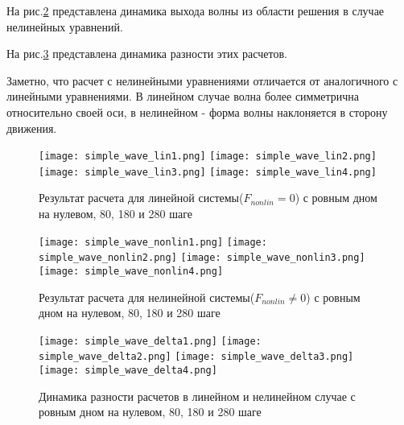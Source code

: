 На рис.\ref{fig:SimpleWaveNonLin} представлена динамика выхода волны из области решения в случае нелинейных уравнений.

На рис.\ref{fig:SimpleWaveDelta} представлена динамика разности этих расчетов.

Заметно, что расчет с нелинейными уравнениями отличается от аналогичного с линейными уравнениями. В линейном случае волна более симметрична относительно своей оси, в нелинейном - форма волны наклоняется в сторону движения.

\newpage
\begin{figure}[htp]
    \centering
    \vspace{12em}
    \texttt{[image: simple\_wave\_lin1.png]}
    \texttt{[image: simple\_wave\_lin2.png]}
    \texttt{[image: simple\_wave\_lin3.png]}
    \texttt{[image: simple\_wave\_lin4.png]}
    \caption{Результат расчета для линейной системы($F_{nonlin}=0$) с ровным дном на нулевом, 80, 180 и 280 шаге}
    \label{fig:SimpleWaveLin}
\end{figure}

\newpage
\begin{figure}[htp]
    \centering
    \vspace{12em}
    \texttt{[image: simple\_wave\_nonlin1.png]}
    \texttt{[image: simple\_wave\_nonlin2.png]}
    \texttt{[image: simple\_wave\_nonlin3.png]}
    \texttt{[image: simple\_wave\_nonlin4.png]}
    \caption{Результат расчета для нелинейной системы($F_{nonlin}\neq 0$) с ровным дном на нулевом, 80, 180 и 280 шаге}
    \label{fig:SimpleWaveNonLin}
\end{figure}

\newpage
\begin{figure}[htp]
    \centering
    \vspace{12em}
    \texttt{[image: simple\_wave\_delta1.png]}
    \texttt{[image: simple\_wave\_delta2.png]}
    \texttt{[image: simple\_wave\_delta3.png]}
    \texttt{[image: simple\_wave\_delta4.png]}
    \caption{Динамика разности расчетов в линейном и нелинейном случае с ровным дном на нулевом, 80, 180 и 280 шаге}
    \label{fig:SimpleWaveDelta}
\end{figure}

